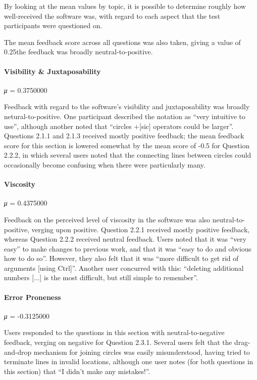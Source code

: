 \documentclass[12pt,twoside,notitlepage,xetex]{report}
\begin{document}
By looking at the mean values by topic, it is possible to determine roughly how well-received the software was, with regard to each aspect that the test participants were questioned on.

The mean feedback score across all questions was also taken, giving a value of 0.25the feedback was broadly neutral-to-positive.

\paragraph{Visibility \& Juxtaposability}\hfill

\emph{μ} = 0.3750000

Feedback with regard to the software's visibility and juxtaposability was broadly netural-to-positive.  One participant described the notation as ``very intuitive to use'', although another noted that ``circles +[sic] operators could be larger''.  Questions 2.1.1 and 2.1.3 received mostly positive feedback; the mean feedback score for this section is lowered somewhat by the mean score of -0.5 for Question 2.2.2, in which several users noted that the connecting lines between circles could occasionally become confusing when there were particularly many.

\paragraph{Viscosity}\hfill

\emph{μ} = 0.4375000

Feedback on the perceived level of viscosity in the software was also neutral-to-positive, verging upon positive. Question 2.2.1 received mostly positive feedback, whereas Question 2.2.2 received neutral feedback.  Users noted that it was ``very easy'' to make changes to previous work, and that it was ``easy to do and obvious how to do so''.  However, they also felt that it was ``more difficult to get rid of arguments [using Ctrl]''.  Another user concurred with this: ``deleting additional numbers [...] is the most difficult, but still simple to remember''.

\paragraph{Error Proneness}\hfill

\emph{μ} = -0.3125000

Users responded to the questions in this section with neutral-to-negative feedback, verging on negative for Question 2.3.1.  Several users felt that the drag-and-drop mechanism for joining circles was easily misunderstood, having tried to terminate lines in invalid locations, although one user notes (for both questions in this section) that ``I didn't make any mistakes!''.
\end{document}
